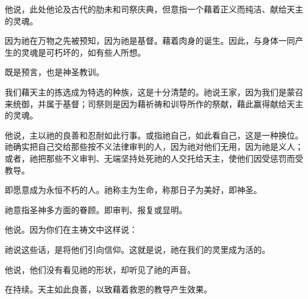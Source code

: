 他说，此处他论及古代的肋未和司祭庆典，但意指一个藉着正义而纯洁、献给天主的灵魂。\par

因为祂在万物之先被预知，因为祂是基督。藉着肉身的诞生。因此，与身体一同产生的灵魂是可朽坏的，如有些人所想。\par

既是预言，也是神圣教训。\par

我们藉天主的拣选成为特选的种族，这是十分清楚的。祂说王家，因为我们是蒙召来统御，并属于基督；司祭则是因为藉祈祷和训导所作的祭献，藉此赢得献给天主的灵魂。\par

他说，主以祂的良善和忍耐如此行事。或指祂自己，如此看自己，这是一种换位。祂确实把自己交给那些按不义法律审判的人，因为祂对他们无用，因为祂是义人；或者，祂把那些不义审判、无端坚持处死祂的人交托给天主，使他们因受惩罚而受教导。\par

即愿意成为永恒不朽的人。祂称主为生命，称那日子为美好，即神圣。\par

祂意指圣神多方面的眷顾。即审判、报复或显明。\par

他说。因为你们在主祷文中这样说：\par

祂说这些话，是将他们引向信仰。这就是说，祂在我们的灵里成为活的。\par

他说，他们没有看见祂的形状，却听见了祂的声音。\par

在持续。天主如此良善，以致藉着救恩的教导产生效果。\par

